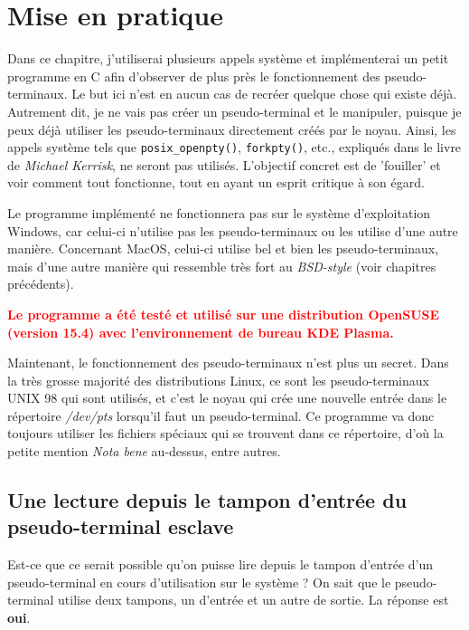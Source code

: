 \chapter{Mise en pratique}
Dans ce chapitre, j'utiliserai plusieurs appels système et implémenterai un petit programme en C afin d'observer de plus près le fonctionnement des pseudo-terminaux. Le but ici n'est en aucun cas de recréer quelque chose qui existe déjà. Autrement dit, je ne vais pas créer un pseudo-terminal et le manipuler, puisque je peux déjà utiliser les pseudo-terminaux directement créés par le noyau. Ainsi, les appels système tels que \texttt{posix\_openpty()}, \texttt{forkpty()}, etc., expliqués dans le livre de \textit{Michael Kerrisk}, ne seront pas utilisés. L'objectif concret est de 'fouiller' et voir comment tout fonctionne, tout en ayant un esprit critique à son égard.

\begin{tcolorbox}[title=Nota bene, colback=red!20]
Le programme implémenté ne fonctionnera pas sur le système d'exploitation Windows\texttrademark{}, car celui-ci n'utilise pas les pseudo-terminaux ou les utilise d'une autre manière. Concernant MacOS\texttrademark{}, celui-ci utilise bel et bien les pseudo-terminaux, mais d'une autre manière qui ressemble très fort au \textit{BSD-style} (voir chapitres précédents).
\end{tcolorbox}

\textcolor{red}{\textbf{Le programme a été testé et utilisé sur une distribution OpenSUSE (version 15.4) avec l'environnement de bureau KDE Plasma.}}

\vspace{\baselineskip}

Maintenant, le fonctionnement des pseudo-terminaux n'est plus un secret. Dans la très grosse majorité des distributions Linux, ce sont les pseudo-terminaux UNIX 98 qui sont utilisés, et c'est le noyau qui crée une nouvelle entrée dans le répertoire \textit{/dev/pts} lorsqu'il faut un pseudo-terminal. Ce programme va donc toujours utiliser les fichiers spéciaux qui se trouvent dans ce répertoire, d'où la petite mention \textit{Nota bene} au-dessus, entre autres.

\newpage

\section{Une lecture depuis le tampon d'entrée du pseudo-terminal esclave}
Est-ce que ce serait possible qu'on puisse lire depuis le tampon d'entrée d'un pseudo-terminal en cours d'utilisation sur le système ? On sait que le pseudo-terminal utilise deux tampons, un d'entrée et un autre de sortie. La réponse est \textbf{oui}.

